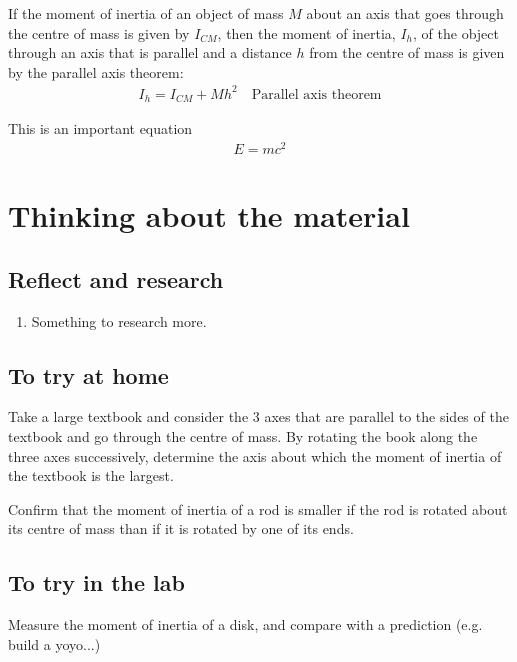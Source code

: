 \begin{chapterSummary}
If the moment of inertia of an object of mass $M$ about an axis that goes through the centre of mass is given by $I_{CM}$, then the moment of inertia, $I_h$, of the object through an axis that is parallel and a distance $h$ from the centre of mass is given by the parallel axis theorem:
\begin{align*}
I_h = I_{CM} + Mh^2 \quad \text{Parallel axis theorem}
\end{align*}



\end{chapterSummary}

\newpage
\begin{importantEquations}
This is an important equation
\begin{align*}
E = mc^2
\end{align*}

\end{importantEquations}


\newpage
\section{Thinking about the material}
\subsection{Reflect and research}

\begin{enumerate}
\item Something to research more.
\end{enumerate}
\subsection{To try at home}

\begin{tQuestion}Take a large textbook and consider the 3 axes that are parallel to the sides of the textbook and go through the centre of mass. By rotating the book along the three axes successively, determine the axis about which the moment of inertia of the textbook is the largest.\end{tQuestion}

\begin{tQuestion}Confirm that the moment of inertia of a rod is smaller if the rod is rotated about its centre of mass than if it is rotated by one of its ends.\end{tQuestion}


\subsection{To try in the lab}
Measure the moment of inertia of a disk, and compare with a prediction (e.g. build a yoyo...)

